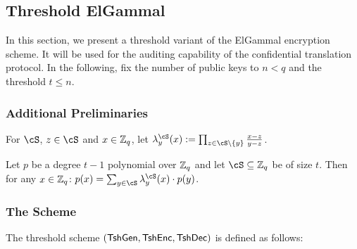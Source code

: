 \newcommand{\tdEnc}{\MathAlgX{TshEnc}}
\newcommand{\tdDec}{\MathAlgX{TshDec}}

\subsection{Threshold ElGammal}\label{sec:ChanksEg:TshEG}	
In this section, we present   a threshold  variant of the ElGammal encryption scheme. It will be used for the  auditing capability  of the confidential translation protocol.   In the following, fix the number of public keys to $n<q$ and the threshold $t \le n$. 


\subsubsection{Additional Preliminaries}\label{sec:ChanksEg:TshEG:Pre}	




\begin{notation}
 	For $\cS$, $z\in \cS$ and $x\in {\mathbb Z}_q$, let $\lambda_y^\cS(x) \eqdef \prod_{z \in \cS \setminus \set{y}} \frac{x-z}{y-z}$.
\end{notation}

\begin{fact}
	Let $p$ be a  degree $t-1$ polynomial over ${\mathbb Z}_q$ and let $\cS \subseteq \Z_q$  be of size $t$.  Then for  any $x\in {\mathbb Z}_q$: $p(x) = \sum_{y \in \cS}   \lambda_y^\cS(x) \cdot p(y)$.
\end{fact}

\subsubsection{The Scheme}
The threshold scheme  $(\tdKg,\tdEnc,\tdDec)$ is defined as follows:


